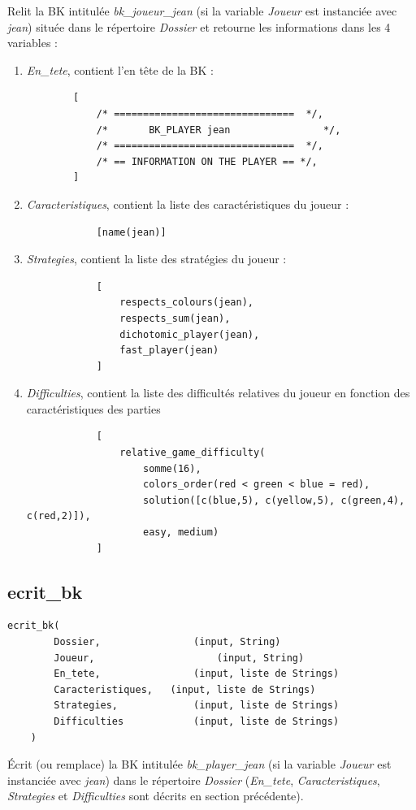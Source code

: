\documentclass[a4paper,12pt]{article}
\begin{document}
Relit la BK intitulée \emph{bk\_joueur\_jean} (si la variable \emph{Joueur} est instanciée avec \emph{jean}) située dans le répertoire \emph{Dossier}
et retourne les informations dans les 4 variables :
\begin{enumerate}
	\item \emph{En\_tete}, contient l’en tête de la BK :
		\begin{Verbatim}
		[
			/* ===============================	*/,
			/*       BK_PLAYER jean 			   */,
			/* ===============================	*/,
			/* == INFORMATION ON THE PLAYER	== */,
		]
		\end{Verbatim}
	\item \emph{Caracteristiques}, contient la liste des caractéristiques du joueur : 
		\begin{Verbatim}
			[name(jean)]
		\end{Verbatim}
	\item \emph{Strategies}, contient la liste des stratégies du joueur :
		\begin{Verbatim}
			[
				respects_colours(jean), 
				respects_sum(jean),
				dichotomic_player(jean), 
				fast_player(jean)
			]
		\end{Verbatim}
		\item \emph{Difficulties}, contient la liste des difficultés relatives du joueur en fonction des caractéristiques des parties
		\begin{Verbatim}
			[
				relative_game_difficulty(
					somme(16), 
					colors_order(red < green < blue = red), 
					solution([c(blue,5), c(yellow,5), c(green,4), c(red,2)]), 
					easy, medium)
			]
		\end{Verbatim}
\end{enumerate}

\subsection{ecrit\_bk}

\begin{Verbatim}
ecrit_bk(
		Dossier, 				(input, String)
		Joueur, 					(input, String)
		En_tete, 				(input, liste de Strings)
		Caracteristiques, 	(input, liste de Strings)
		Strategies,				(input, liste de Strings)
		Difficulties			(input, liste de Strings)
	)
\end{Verbatim}

Écrit (ou remplace) la BK intitulée \emph{bk\_player\_jean} (si la variable \emph{Joueur} est instanciée avec \emph{jean}) dans le répertoire \emph{Dossier}
(\emph{En\_tete}, \emph{Caracteristiques}, \emph{Strategies} et \emph{Difficulties} sont décrits en section précédente). 
\end{document}
